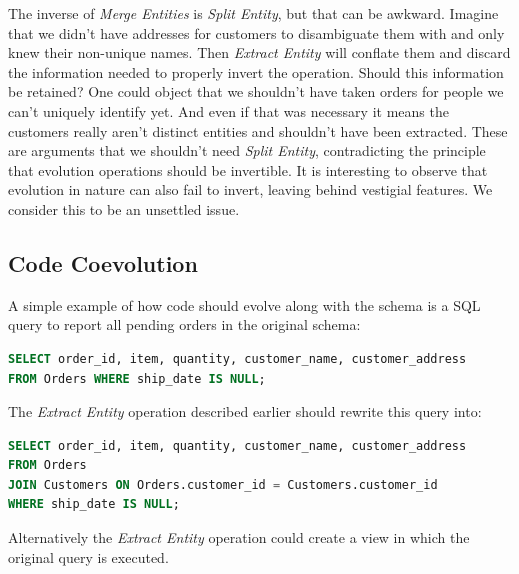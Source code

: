 \documentclass[english,submission]{programming}
\begin{document}
The inverse of \textit{Merge Entities} is \textit{Split Entity}, but that can be awkward. Imagine that we didn't have addresses for customers to disambiguate them with and only knew their non-unique names. Then \textit{Extract Entity} will conflate them and discard the information needed to properly invert the operation. Should this information be retained? One could object that we shouldn't have taken orders for people we can't uniquely identify yet. And even if that was necessary it means the customers really aren't distinct entities and shouldn't have been extracted. These are arguments that we shouldn't need \textit{Split Entity}, contradicting the principle that evolution operations should be invertible. It is interesting to observe that evolution in nature can also fail to invert, leaving behind vestigial features. We consider this to be an unsettled issue.

\subsection{Code Coevolution}
A simple example of how code should evolve along with the schema is a SQL query to report all pending orders in the original schema:

\begin{lstlisting}[language=SQL]
SELECT order_id, item, quantity, customer_name, customer_address
FROM Orders WHERE ship_date IS NULL;
\end{lstlisting}

The \textit{Extract Entity} operation described earlier should rewrite this query into:

\begin{lstlisting}[language=SQL]
SELECT order_id, item, quantity, customer_name, customer_address
FROM Orders
JOIN Customers ON Orders.customer_id = Customers.customer_id
WHERE ship_date IS NULL;
\end{lstlisting}

Alternatively the \textit{Extract Entity} operation could create a view in which the original query is executed.
\end{document}
